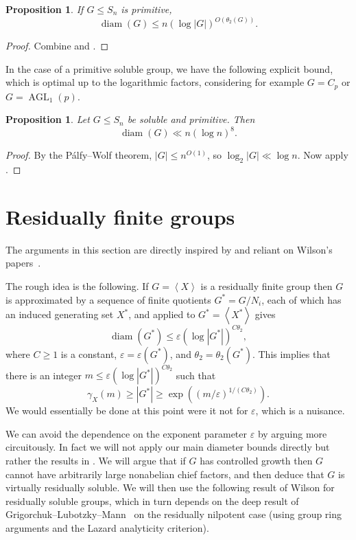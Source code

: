\documentclass[11pt,reqno]{amsart}
\numberwithin{equation}{section}
\newtheorem{proposition}[theorem]{Proposition}
\theoremstyle{definition}
\theoremstyle{remark}
\newcommand\opr[1]{\operatorname{#1}}
\def\AGL{\opr{AGL}}
\def\diam{\opr{diam}}
\def\eps{\varepsilon}
\newcommand\gen[1]{\left\langle#1\right\rangle}
\numberwithin{equation}{section}
\begin{document}
\begin{proposition}
    If $G \le S_n$ is primitive,
    \[
    \diam(G) \le n (\log |G|)^{O(\theta_2(G))}.
    \]
\end{proposition}
\begin{proof}
    Combine  and .
\end{proof}

In the case of a primitive soluble group, we have the following explicit bound, which is optimal up to the logarithmic factors, considering for example $G = C_p$ or $G = \AGL_1(p)$.

\begin{proposition}
    Let $G \le S_n$ be soluble and primitive. Then
    \[
        \diam(G) \ll n (\log n)^8.
    \]
\end{proposition}
\begin{proof}
    By the P\'alfy--Wolf theorem, $|G| \le n^{O(1)}$, so $\log_2 |G| \ll \log n$.
    Now apply .
\end{proof}

\section{Residually finite groups}

The arguments in this section are directly inspired by and reliant on Wilson's papers~\cites{wilson1,wilson2}.

The rough idea is the following.
If $G = \gen X$ is a residually finite group then $G$ is approximated by a sequence of finite quotients $G^* = G / N_i$, each of which has an induced generating set $X^*$, and  applied to $G^* = \gen {X^*}$ gives
\[
    \diam(G^*) \le \eps (\log |G^*|)^{C \theta_2},
\]
where $C \ge 1$ is a constant, $\eps = \eps(G^*)$, and $\theta_2 = \theta_2(G^*)$.
This implies that there is an integer $m \le \eps (\log |G^*|)^{C\theta_2}$ such that
\[
    \gamma_X(m) \ge |G^*| \ge \exp((m / \eps)^{1/(C\theta_2)}).
\]
We would essentially be done at this point were it not for $\eps$, which is a nuisance.

We can avoid the dependence on the exponent parameter $\eps$ by arguing more circuitously.
In fact we will not apply our main diameter bounds directly but rather the results in .
We will argue that if $G$ has controlled growth then $G$ cannot have arbitrarily large nonabelian chief factors, and then deduce that $G$ is virtually residually soluble.
We will then use the following result of Wilson for residually soluble groups, which in turn depends on the deep result of Grigorchuk--Lubotzky--Mann~\cites{grig-residually-nilpotent,lubotzky--mann} on the residually nilpotent case (using group ring arguments and the Lazard analyticity criterion).
\end{document}
